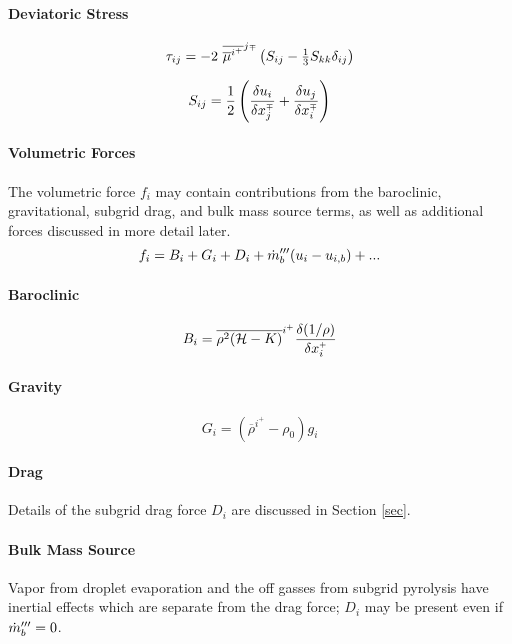 \documentclass[11pt]{article}
\begin{document}
\paragraph{Deviatoric Stress}

\begin{equation}
\label{eqn_deviatoric_stress}
\tau_{ij} = -2 \,\,\overline{\overline{\mu}^{i^+}}^{j{\scriptscriptstyle \mp}} \left( S_{ij} - \mbox{$\frac{1}{3}$} S_{kk} \delta_{ij} \right)
\end{equation}

\begin{equation}
\label{eqn_strain_tensor}
S_{ij} = \frac{1}{2}\left( \frac{\delta u_i}{\delta x_j^{\scriptscriptstyle \mp}} + \frac{\delta u_j}{\delta x_i^{\scriptscriptstyle \mp}} \right)
\end{equation}

\paragraph{Volumetric Forces} The volumetric force $f_i$ may contain contributions from the baroclinic, gravitational, subgrid drag, and bulk mass source terms, as well as additional forces discussed in more detail later.
\begin{equation}
f_i = B_i + G_i + D_i + \dot{m}_b^{\prime\prime\prime}(u_i - u_{i,b}) + ...
\end{equation}

\paragraph{Baroclinic}
\begin{equation}
B_i = \overline{\rho^2({\cal H} - K)}^{i^{\scriptscriptstyle +}} \frac{\delta (1/\rho)}{\delta x_i^{\scriptscriptstyle +}}
\end{equation}

\paragraph{Gravity}
\begin{equation}
G_i = (\overline{\rho}^{i^+}-\rho_0)g_i
\end{equation}

\paragraph{Drag} Details of the subgrid drag force $D_i$ are discussed in Section \ref{sec}.

\paragraph{Bulk Mass Source} Vapor from droplet evaporation and the off gasses from subgrid pyrolysis have inertial effects which are separate from the drag force; $D_i$ may be present even if $\dot{m}_b^{\prime\prime\prime}=0$.
\end{document}
